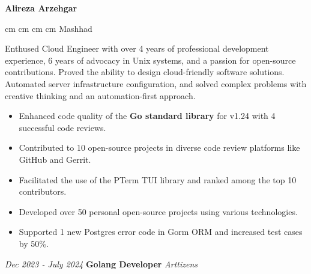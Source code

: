 \documentclass{engineercv}
\begin{document}
\begin{center}
  \textbf{\fontsize{24 pt}{24 pt}\selectfont Alireza Arzehgar}

  \vspace{0.2 cm}

  \scriptsize
  \mbox{}
   cm
  \mbox{}
   cm
  \mbox{}
   cm
  \mbox{}
   cm
  \mbox{{\color{black}\footnotesize\faMapMarker*}\hspace*{0.13cm}Mashhad}
\end{center}

Enthused Cloud Engineer with over 4 years of professional development experience,
6 years of advocacy in Unix systems, and a passion for open-source contributions. Proved the ability
to design cloud-friendly software solutions. Automated server infrastructure configuration,
and solved complex problems with creative thinking and an automation-first approach.

\begin{itemize}
  \item Enhanced code quality of the \textbf{Go standard library} for v1.24 with 4 successful code reviews.
  \item Contributed to 10 open-source projects in diverse code review platforms like GitHub and Gerrit.
  \item Facilitated the use of the PTerm TUI library and ranked among the top 10 contributors.
  \item Developed over 50 personal open-source projects using various technologies.
  \item Supported 1 new Postgres error code in Gorm ORM and increased test cases by 50\%.
\end{itemize}

\begin{twocolentry}{\textit{Dec 2023 - July 2024}}
  \textbf{Golang Developer}
  \textit{Arttizens}
\end{twocolentry}
\end{document}
